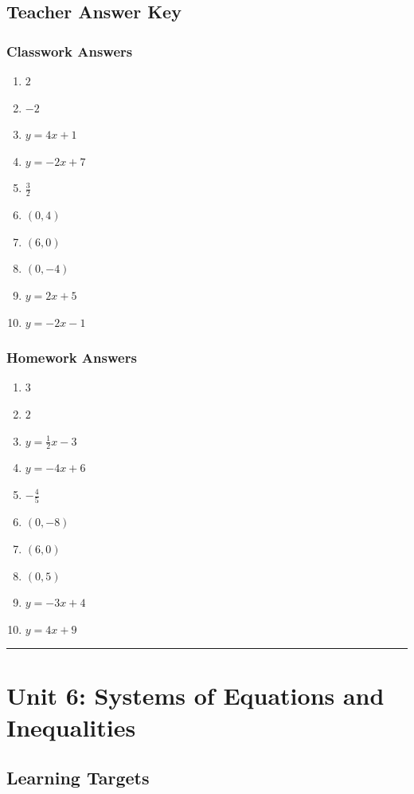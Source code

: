 \documentclass[11pt]{book}
\begin{document}
\section{Teacher Answer Key}

\subsection{Classwork Answers}

\begin{enumerate}
\item \(2\)
\item \(-2\)
\item \(y=4x+1\)
\item \(y=-2x+7\)
\item \(\frac32\)
\item \((0,4)\)
\item \((6,0)\)
\item \((0,-4)\)
\item \(y=2x+5\)
\item \(y=-2x-1\)
\end{enumerate}

\subsection{Homework Answers}

\begin{enumerate}
\item \(3\)
\item \(2\)
\item \(y=\frac12x-3\)
\item \(y=-4x+6\)
\item \(-\frac45\)
\item \((0,-8)\)
\item \((6,0)\)
\item \((0,5)\)
\item \(y=-3x+4\)
\item \(y=4x+9\)
\end{enumerate}

\bigskip\hrule\bigskip

\chapter{Unit 6: Systems of Equations and Inequalities}

\section{Learning Targets}
\end{document}
